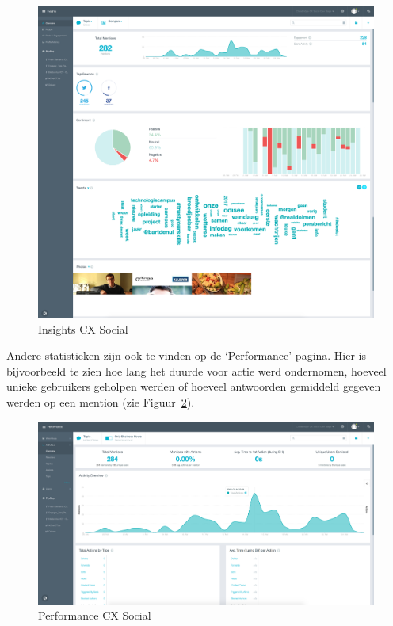 \begin{figure}[H]
	\centering
	\includegraphics[width=1\textwidth]{Figuren/Insights.png}
	\caption{Insights CX Social \cite{EngagorScreenshots}} %
	\label{fig:Insights}
\end{figure} 

Andere statistieken zijn ook te vinden op de `Performance' pagina. Hier is bijvoorbeeld te zien hoe lang het duurde voor actie werd ondernomen, hoeveel unieke gebruikers geholpen werden of hoeveel antwoorden gemiddeld gegeven werden op een mention (zie Figuur~\ref{fig:Performance}).

\begin{figure}[H]
	\centering
	\includegraphics[width=1\textwidth]{Figuren/Performance.png}
	\caption{Performance CX Social \cite{EngagorScreenshots}} %
	\label{fig:Performance}
\end{figure} 


